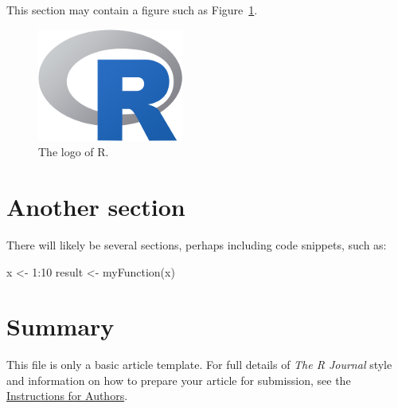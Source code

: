 This section may contain a figure such as Figure~\ref{figure:rlogo}.

\begin{figure}[htbp]
  \centering
  \includegraphics{Rlogo-5}
  \caption{The logo of R.}
  \label{figure:rlogo}
\end{figure}

\section{Another section}

There will likely be several sections, perhaps including code snippets, such as:

\begin{example}
  x <- 1:10
  result <- myFunction(x)
\end{example}

\section{Summary}

This file is only a basic article template. For full details of \emph{The R Journal} style and information on how to prepare your article for submission, see the \href{https://journal.r-project.org/share/author-guide.pdf}{Instructions for Authors}.



\address{Jaros\l{}aw Chilmoniuk\\
  Affiliation\\
  Address\\
  Country\\
  (ORCiD if desired)\\
  }

\address{Madeleine Ruhe\\
  Affiliation\\
  Address\\
  Country\\
  (ORCiD if desired)\\
  }

\address{Stefan R\"{o}diger\\
  Affiliation\\
  Address\\
  Country\\
  (ORCiD if desired)\\
  }

\address{Micha\l{} Burdukiewicz\\
  Affiliation\\
  Address\\
  Country\\
  (ORCiD if desired)\\
  }
